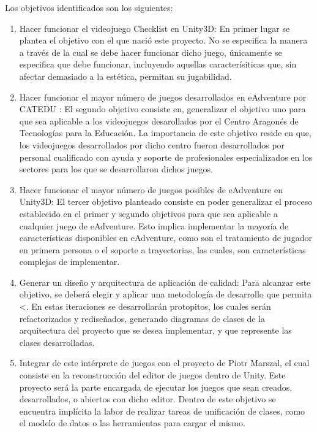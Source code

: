 Los objetivos identificados son los siguientes:
\begin{enumerate}
	\item Hacer funcionar el videojuego Checklist en Unity3D: En primer lugar se plantea el objetivo con el que nació este proyecto. No se especifica la manera a través de la cual se debe hacer funcionar dicho juego, únicamente se especifica que debe funcionar, incluyendo aquellas caracterísiticas que, sin afectar demasiado a la estética, permitan su jugabilidad.
	
	\item Hacer funcionar el mayor número de juegos desarrollados en eAdventure por CATEDU \cite{catedu}: El segundo objetivo consiste en, generalizar el objetivo uno para que sea aplicable a los videojuegos desarollados por el Centro Aragonés de Tecnologías para la Educación. La importancia de este objetivo reside en que, los videojuegos desarrollados por dicho centro fueron desarrollados por personal cualificado con ayuda y soporte de profesionales especializados en los sectores para los que se desarrollaron dichos juegos.
	
	\item Hacer funcionar el mayor número de juegos posibles de eAdventure en Unity3D: El tercer objetivo planteado consiste en poder generalizar el proceso establecido en el primer y segundo objetivos para que sea aplicable a cualquier juego de eAdventure. Esto implica implementar la mayoría de características disponibles en eAdventure, como son el tratamiento de jugador en primera persona o el soporte a trayectorias, las cuales, son características complejas de implementar.
	
	\item Generar un diseño y arquitectura de aplicación de calidad: Para alcanzar este objetivo, se deberá elegir y aplicar una metodología de desarrollo que permita <. En estas iteraciones se desarrollarán protopitos, los cuales serán refactorizados y rediseñados, generando diagramas de clases de la arquitectura del proyecto que se desea implementar, y que represente las clases desarrolladas.
	
	\item Integrar de este intérprete de juegos con el proyecto de Piotr Marszal, el cual consiste en la reconstrucción del editor de juegos dentro de Unity. Este proyecto será la parte encargada de ejecutar los juegos que sean creados, desarrollados, o abiertos con dicho editor. Dentro de este objetivo se encuentra implícita la labor de realizar tareas de unificación de clases, como el modelo de datos o las herramientas para cargar el mismo.
	

\end{enumerate}
